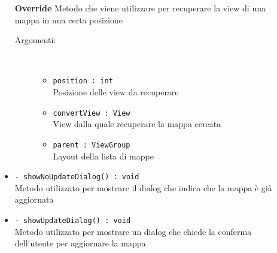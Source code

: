 \documentclass[../DefinizioneDiProdotto.tex]{subfiles}
\begin{document}
\begin{description}
\begin{itemize}
		\textbf{Override} Metodo che viene utilizzare per recuperare la view di una mappa in una certa posizione
		\begin{description}
			\item[Argomenti:] \
			\begin{itemize}
				\item \texttt{position : int}\\
				Posizione delle view da recuperare\item \texttt{convertView : View}\\
				View dalla quale recuperare la mappa cercata\item \texttt{parent : ViewGroup}\\
				Layout della lista di mappe\end{itemize}
		\end{description}
		\item \texttt{- showNoUpdateDialog() : void}\\
		Metodo utilizzato per mostrare il dialog che indica che la mappa è già aggiornata
		\item \texttt{- showUpdateDialog() : void}\\
		Metodo utilizzato per mostrare un dialog che chiede la conferma dell'utente per aggiornare la mappa
	\end{itemize}
\end{description}
\end{document}
